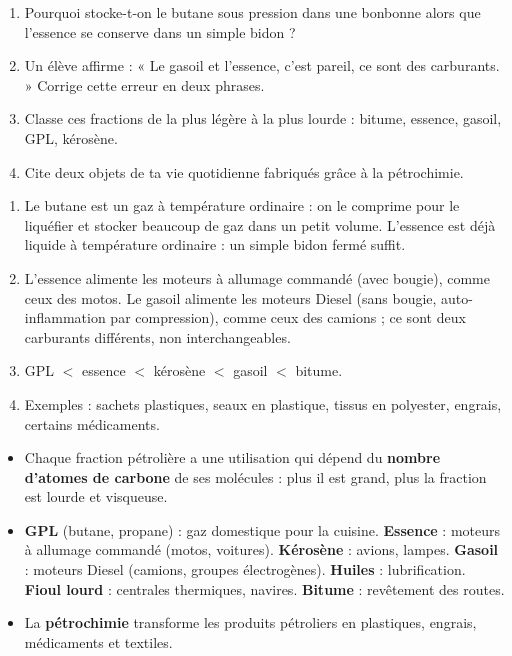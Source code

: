 \documentclass[11pt]{article}
\begin{document}
\begin{exercice}
\begin{enumerate}
\item Pourquoi stocke-t-on le butane sous pression dans une bonbonne alors que l'essence se conserve dans un simple bidon ?
\item Un élève affirme : « Le gasoil et l'essence, c'est pareil, ce sont des carburants. » Corrige cette erreur en deux phrases.
\item Classe ces fractions de la plus légère à la plus lourde : bitume, essence, gasoil, GPL, kérosène.
\item Cite deux objets de ta vie quotidienne fabriqués grâce à la pétrochimie.
\end{enumerate}
\end{exercice}

\begin{corrige}
\begin{enumerate}
\item Le butane est un gaz à température ordinaire : on le comprime pour le liquéfier et stocker beaucoup de gaz dans un petit volume. L'essence est déjà liquide à température ordinaire : un simple bidon fermé suffit.
\item L'essence alimente les moteurs à allumage commandé (avec bougie), comme ceux des motos. Le gasoil alimente les moteurs Diesel (sans bougie, auto-inflammation par compression), comme ceux des camions ; ce sont deux carburants différents, non interchangeables.
\item GPL $<$ essence $<$ kérosène $<$ gasoil $<$ bitume.
\item Exemples : sachets plastiques, seaux en plastique, tissus en polyester, engrais, certains médicaments.
\end{enumerate}
\end{corrige}

\begin{aretenir}
\begin{itemize}
\item Chaque fraction pétrolière a une utilisation qui dépend du \textbf{nombre d'atomes de carbone} de ses molécules : plus il est grand, plus la fraction est lourde et visqueuse.
\item \textbf{GPL} (butane, propane) : gaz domestique pour la cuisine. \textbf{Essence} : moteurs à allumage commandé (motos, voitures). \textbf{Kérosène} : avions, lampes. \textbf{Gasoil} : moteurs Diesel (camions, groupes électrogènes). \textbf{Huiles} : lubrification. \textbf{Fioul lourd} : centrales thermiques, navires. \textbf{Bitume} : revêtement des routes.
\item La \textbf{pétrochimie} transforme les produits pétroliers en plastiques, engrais, médicaments et textiles.
\end{itemize}
\end{aretenir}
\end{document}
